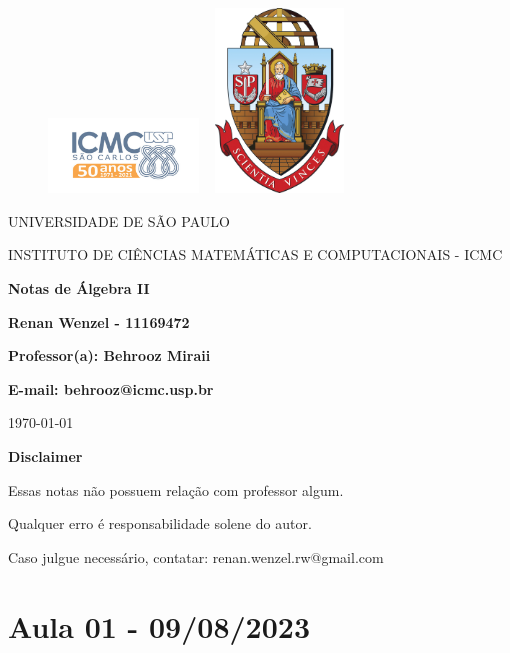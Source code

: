 \documentclass{article}
\begin{document}
\begin{figure}[ht]
\includegraphics[width=4cm]{icmc.png}
\hspace{7cm}
\includegraphics[height=4.9cm,width=4cm]{brasao_usp_cor.jpg}
\endminipage  
\end{figure}

\begin{center}
\vspace{1cm}
\LARGE
UNIVERSIDADE DE S\~AO PAULO

\vspace{1.3cm}
\LARGE
INSTITUTO DE CI\^ENCIAS MATEM\'ATICAS E COMPUTACIONAIS - ICMC

\vspace{1.7cm}
\Large
\textbf{Notas de Álgebra II}

\vspace{1.3cm}
\large
\textbf{Renan Wenzel - 11169472}

\vspace{1.3cm}
\large
\textbf{Professor(a): Behrooz Miraii}

\textbf{E-mail: behrooz@icmc.usp.br}

\vspace{1.3cm}
\today
\end{center}

\newpage
\textbf{{\Huge Disclaimer}}
\vspace{5cm}

{\huge Essas notas não possuem relação com professor algum. 

Qualquer erro é responsabilidade solene do autor.

Caso julgue necessário, contatar: renan.wenzel.rw@gmail.com}
\tableofcontents

\newpage

\section{Aula 01 - 09/08/2023}
\end{document}
